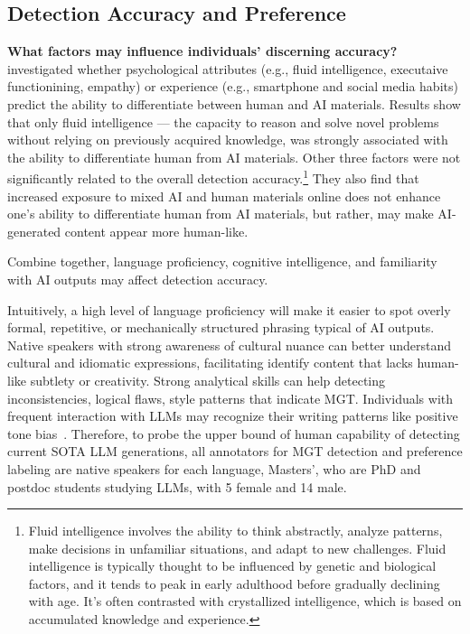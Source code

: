 \subsection{Detection Accuracy and Preference}
\label{sec:whyexperts}
\textbf{What factors may influence individuals' discerning accuracy?}
\citet{chein2024human} investigated whether psychological attributes (e.g., fluid intelligence, executaive functionining, empathy) or experience (e.g., smartphone and social media habits) predict the ability to differentiate between human and AI materials. Results show that only fluid intelligence --- the capacity to reason and solve novel problems without relying on previously acquired knowledge, was strongly associated with the ability to differentiate human from AI materials. Other three factors were not significantly related to the overall detection accuracy.\footnote{Fluid intelligence involves the ability to think abstractly, analyze patterns, make decisions in unfamiliar situations, and adapt to new challenges. Fluid intelligence is typically thought to be influenced by genetic and biological factors, and it tends to peak in early adulthood before gradually declining with age. It's often contrasted with crystallized intelligence, which is based on accumulated knowledge and experience.}
They also find that increased exposure to mixed AI and human materials online does not enhance one’s ability to differentiate human from AI materials, but rather, may make AI-generated content appear more human-like. 


Combine together, language proficiency, cognitive intelligence, and familiarity with AI outputs may affect detection accuracy.

Intuitively, a high level of language proficiency will make it easier to spot overly formal, repetitive, or mechanically structured phrasing typical of AI outputs. Native speakers with strong awareness of cultural nuance can better understand cultural and idiomatic expressions, facilitating identify content that lacks human-like subtlety or creativity.
Strong analytical skills can help detecting inconsistencies, logical flaws, style patterns that indicate MGT.
Individuals with frequent interaction with LLMs may recognize their writing patterns like positive tone bias~\cite{guo-etal-2023-hc3, chein2024human}.
Therefore, to probe the upper bound of human capability of detecting current SOTA LLM generations, all annotators for MGT detection and preference labeling are native speakers for each language, Masters', who are PhD and postdoc students studying LLMs, with 5 female and 14 male.

